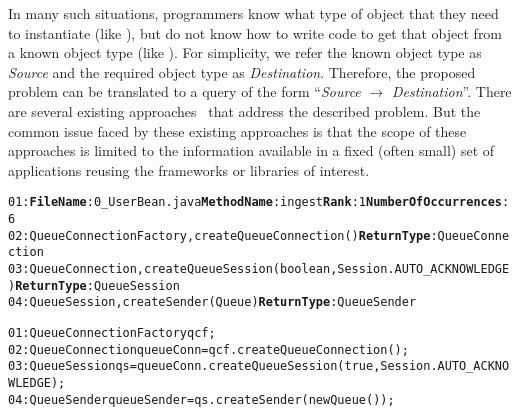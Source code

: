 In many such situations, programmers know what type of object that
they need to instantiate (like ), but do
not know how to write code to get that object from a known object
type (like ). For simplicity, we refer the known
object type as \emph{Source} and the required object type as
\emph{Destination}. Therefore, the proposed problem can be
translated to a query of the form ``\emph{Source} $\rightarrow$
\emph{Destination}''. There are several existing
approaches~\cite{prospector:jungloid, strathcona:se, xsnippet:saha}
that address the described problem. But the common issue faced by
these existing approaches is that the scope of these approaches is
limited to the information available in a fixed (often small) set of
applications reusing the frameworks or libraries of interest.
\begin{figure*}[t]
\begin{CodeOut}
\begin{alltt}
\hspace*{0.6in}01:\textbf{FileName}:0\_UserBean.java \textbf{MethodName}:ingest  \textbf{Rank}:1 \textbf{NumberOfOccurrences}:6
\hspace*{0.6in}02:QueueConnectionFactory,createQueueConnection() \textbf{ReturnType}:QueueConnection
\hspace*{0.6in}03:QueueConnection,createQueueSession(boolean,Session.AUTO\_ACKNOWLEDGE) \textbf{ReturnType}:QueueSession
\hspace*{0.6in}04:QueueSession,createSender(Queue) \textbf{ReturnType}:QueueSender
\end{alltt}
\end{CodeOut}
\vspace*{-4ex} 
\begin{CodeOut}
\begin{alltt}
\hspace*{0.6in}01:QueueConnectionFactory qcf;
\hspace*{0.6in}02:QueueConnection queueConn = qcf.createQueueConnection();
\hspace*{0.6in}03:QueueSession qs = queueConn.createQueueSession(true,Session.AUTO\_ACKNOWLEDGE);
\hspace*{0.6in}04:QueueSender queueSender = qs.createSender(new Queue());
\end{alltt}
\end{CodeOut}\vspace*{-4ex}
 \vspace*{-3ex}
\end{figure*}
